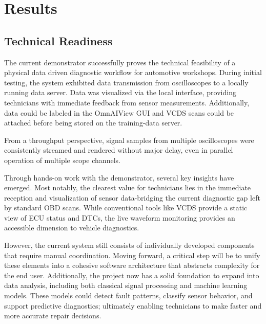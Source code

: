 \documentclass[conference,a4paper]{IEEEtran}
\begin{document}
\section{Results}
\subsection{Technical Readiness}
The current demonstrator successfully proves the technical feasibility of a physical data driven diagnostic workflow for automotive workshops. 
During initial testing, the system exhibited data transmission from oscilloscopes to a locally running data server.
Data was visualized via the local interface, providing technicians with immediate feedback from sensor measurements.
Additionally, data could be labeled in the OmnAIView GUI and VCDS scans could be attached before being stored on the training-data server.

From a throughput perspective, signal samples from multiple oscilloscopes were consistently streamed and rendered without major delay, even in parallel operation of multiple scope channels. 

Through hands-on work with the demonstrator, several key insights have emerged. 
Most notably, the clearest value for technicians lies in the immediate reception and visualization of sensor data-bridging the current diagnostic gap left by standard OBD scans. 
While conventional tools like VCDS provide a static view of ECU status and DTCs, the live waveform monitoring provides an accessible dimension to vehicle diagnostics.

However, the current system still consists of individually developed components that require manual coordination. 
Moving forward, a critical step will be to unify these elements into a cohesive software architecture that abstracts complexity for the end user. 
Additionally, the project now has a solid foundation to expand into data analysis, including both classical signal processing and machine learning models. 
These models could detect fault patterns, classify sensor behavior, and support predictive diagnostics; ultimately enabling technicians to make faster and more accurate repair decisions.
\end{document}
